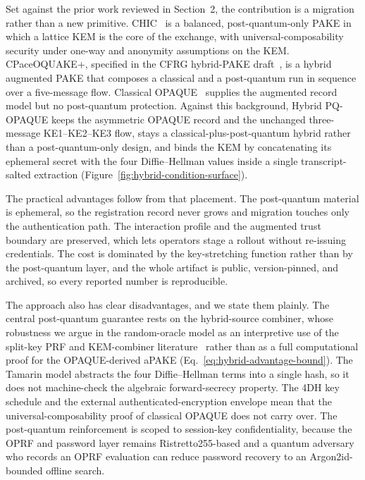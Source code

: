 \documentclass[preprint,12pt]{elsarticle}
\theoremstyle{remark}
\begin{document}
Set against the prior work reviewed in Section~2, the contribution is a
migration rather than a new primitive. CHIC~\cite{arriaga2024} is a balanced,
post-quantum-only PAKE in which a lattice KEM is the core of the exchange, with
universal-composability security under one-way and anonymity assumptions on the
KEM. CPaceOQUAKE+, specified in the CFRG hybrid-PAKE draft~\cite{vos2025}, is a
hybrid augmented PAKE that composes a classical and a post-quantum run in
sequence over a five-message flow. Classical OPAQUE~\cite{jarecki2018,ietf-opaque}
supplies the augmented record model but no post-quantum protection. Against this
background, Hybrid PQ-OPAQUE keeps the asymmetric OPAQUE record and the unchanged
three-message KE1--KE2--KE3 flow, stays a classical-plus-post-quantum hybrid
rather than a post-quantum-only design, and binds the KEM by concatenating its
ephemeral secret with the four Diffie--Hellman values inside a single
transcript-salted extraction (Figure~\ref{fig:hybrid-condition-surface}).

The practical advantages follow from that placement. The post-quantum material
is ephemeral, so the registration record never grows and migration touches only
the authentication path. The interaction profile and the augmented trust
boundary are preserved, which lets operators stage a rollout without re-issuing
credentials. The cost is dominated by the key-stretching function rather than by
the post-quantum layer, and the whole artifact is public, version-pinned, and
archived, so every reported number is reproducible.

The approach also has clear disadvantages, and we state them plainly. The
central post-quantum guarantee rests on the hybrid-source combiner, whose
robustness we argue in the random-oracle model as an interpretive use of the
split-key PRF and KEM-combiner literature~\cite{giacon2018,bindel2019} rather
than as a full computational proof for the OPAQUE-derived aPAKE
(Eq.~\eqref{eq:hybrid-advantage-bound}). The Tamarin model abstracts the four
Diffie--Hellman terms into a single hash, so it does not machine-check the
algebraic forward-secrecy property. The 4DH key schedule and the external
authenticated-encryption envelope mean that the universal-composability proof of
classical OPAQUE does not carry over. The post-quantum reinforcement is scoped to
session-key confidentiality, because the OPRF and password layer remains
Ristretto255-based and a quantum adversary who records an OPRF evaluation can
reduce password recovery to an Argon2id-bounded offline search.
\end{document}
